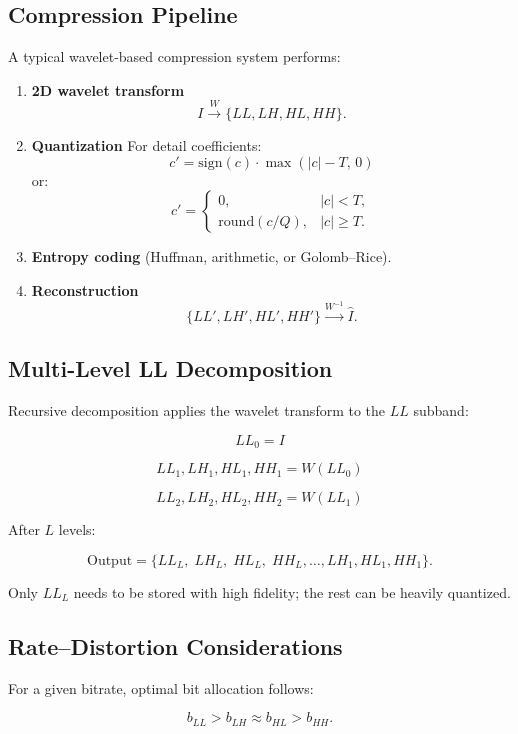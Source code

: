 \documentclass{AnantDocumentation}
\begin{document}
\subsection{Compression Pipeline}

A typical wavelet-based compression system performs:

\begin{enumerate}
\item \textbf{2D wavelet transform}
\[
I \xrightarrow{W} \{LL, LH, HL, HH\}.
\]

\item \textbf{Quantization}  
For detail coefficients:
\[
c' = \text{sign}(c)\cdot \max(|c| - T,\,0)
\]
or:
\[
c' = 
\begin{cases}
0, & |c| < T, \\
\text{round}(c/Q), & |c| \ge T.
\end{cases}
\]

\item \textbf{Entropy coding} (Huffman, arithmetic, or Golomb–Rice).

\item \textbf{Reconstruction}
\[
\{LL', LH', HL', HH'\} \xrightarrow{W^{-1}} \hat{I}.
\]
\end{enumerate}

\subsection{Multi-Level LL Decomposition}

Recursive decomposition applies the wavelet transform to the $LL$ subband:

\[
LL_0 = I
\]

\[
LL_1, LH_1, HL_1, HH_1 = W(LL_0)
\]

\[
LL_2, LH_2, HL_2, HH_2 = W(LL_1)
\]

After $L$ levels:

\[
\text{Output} = \{LL_L,\; LH_L,\; HL_L,\; HH_L,\ldots, LH_1, HL_1, HH_1\}.
\]

Only $LL_L$ needs to be stored with high fidelity; the rest can be heavily quantized.

\subsection{Rate--Distortion Considerations}

For a given bitrate, optimal bit allocation follows:

\[
b_{LL} > b_{LH} \approx b_{HL} > b_{HH}.
\]
\end{document}
